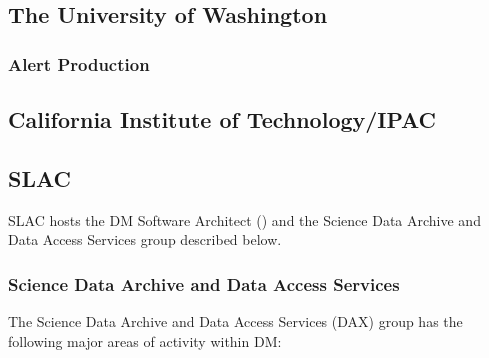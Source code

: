 \subsection {The University of Washington\label{sect:uw}}

\subsubsection{Alert Production\label{sect:ap}}

\subsection {California Institute of Technology/IPAC\label{sect:ipac}}

\subsection {SLAC\label{sect:slac}}
SLAC hosts the DM Software Architect () and the Science Data Archive and Data Access
Services group described below.

\subsubsection{Science Data Archive and Data Access Services \label{sect:dax}}

The Science Data Archive and Data Access Services (DAX) group has the following major areas of activity
within DM:

